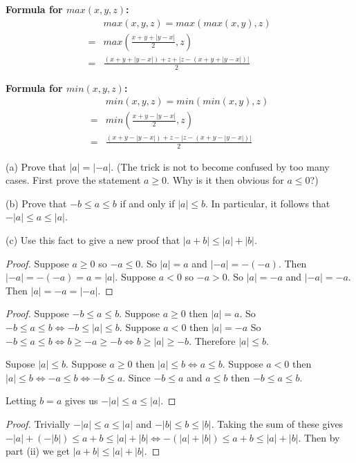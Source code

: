 \textbf{Formula for $max(x, y, z)$:} \begin{align*}
    &max(x, y, z) = max(max(x, y), z) \\
    = &max\left(\frac{x + y + |y - x|}{2}, z\right) \\
    = &\frac{(x + y + |y - x|) + z + |z - (x + y + |y - x|)|}{2}
\end{align*}

\textbf{Formula for $min(x, y, z)$:} \begin{align*}
    &min(x, y, z) = min(min(x, y), z) \\
    = &min\left(\frac{x + y - |y - x|}{2}, z\right) \\
    = &\frac{(x + y - |y - x|) + z - |z - (x + y - |y - x|)|}{2}
\end{align*}

\begin{tcolorbox}[title=Problem 14, breakable]
    (a) Prove that $|a| = |-a|$. (The trick is not to become confused by too many cases.
    First prove the statement $a \ge 0$. Why is it then obvious for $a \le 0$?)

    (b) Prove that $-b \le a \le b$ if and only if $|a| \le b$. In particular,
    it follows that $-|a| \le a \le |a|$.

    (c) Use this fact to give a new proof that $|a + b| \le |a| + |b|$.
\end{tcolorbox}

\begin{proof}
    Suppose $a \ge 0$ so $-a \le 0$. So $|a| = a$ and $|-a| = -(-a)$.
    Then $|-a| = -(-a) = a = |a|$.
    Suppose $a < 0$ so $-a > 0$. So $|a| = -a$ and $|-a| = -a$.
    Then $|a| = -a = |-a|$.
\end{proof}

\begin{proof}
    Suppose $-b \le a \le b$.
    Suppose $a \ge 0$ then $|a| = a$.
    So $-b \le a \le b \iff -b \le |a| \le b$.
    Suppose $a < 0$ then $|a| = -a$
    So $-b \le a \le b \iff b \ge -a \ge -b \iff b \ge |a| \ge -b$.
    Therefore $|a| \le b$.

    Supose $|a| \le b$.
    Suppose $a \ge 0$ then $|a| \le b \iff a \le b$.
    Suppose $a < 0$ then $|a| \le b \iff -a \le b \iff -b \le a$.
    Since $-b \le a$ and $a \le b$ then $-b \le a \le b$.

    Letting $b = a$ gives us $-|a| \le a \le |a|$.
\end{proof}

\begin{proof}
    Trivially $-|a| \le a \le |a|$
        and $-|b| \le b \le |b|$.
    Taking the sum of these gives $-|a| + (-|b|) \le a + b \le |a| + |b|
                                   \iff -(|a| + |b|) \le a + b \le |a| + |b|$.
    Then by part (ii) we get $|a + b| \le |a| + |b|$.
\end{proof}

